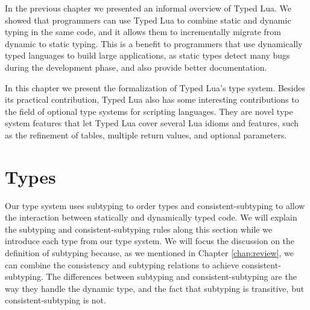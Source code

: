 
In the previous chapter we presented an informal overview of Typed Lua.
We showed that programmers can use Typed Lua to combine static and dynamic
typing in the same code, and it allows them to incrementally migrate from
dynamic to static typing.
This is a benefit to programmers that use dynamically typed languages
to build large applications, as static types detect many bugs
during the development phase, and also provide better documentation.

In this chapter we present the formalization of Typed Lua's type system.
Besides its practical contribution, Typed Lua also has some interesting
contributions to the field of optional type systems for scripting
languages.
They are novel type system features that let Typed Lua cover several Lua idioms
and features, such as the refinement of tables, multiple return values,
and optional parameters.

\section{Types}

Our type system uses subtyping \citep{cardelli1984smi,abadi1996to} to order
types and consistent-subtyping \citep{siek2007objects,siek2013mutable}
to allow the interaction between statically and dynamically typed code.
We will explain the subtyping and consistent-subtyping rules along this
section while we introduce each type from our type system.
We will focus the discussion on the definition of subtyping because,
as we mentioned in Chapter \ref{chap:review}, we can combine the
consistency and subtyping relations to achieve consistent-subtyping.
The differences between subtyping and consistent-subtyping are the way
they handle the dynamic type, and the fact that subtyping is transitive,
but consistent-subtyping is not.

